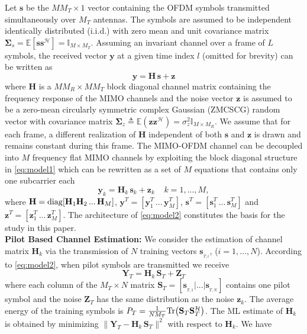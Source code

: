 \documentclass{article}
\def\cro#1{\left[#1\right]}                \def\stdcro#1{[#1]}
\def\bigcro#1{\bigl[#1\bigr]}              \def\biggcro#1{\biggl[#1\biggr]}
\def\esp{{\mathrm{E}}\,}              \def\Esp#1{{\mathrm{E}}\bigcro{#1}}  \def\Esph#1#2{\underset{{#1}}{\mathrm{E}}\bigcro{#2}}               \def\Espold#1{{\mathrm{E}}\cro{#1}}
\def\H{{\mathbf H}}
\def\tg{\mathcal{H}}
\def\y{{\bm y }}
\def\s{{\bm s }}
\def\z{{\bm z }}
\def\esp{{\mathbb E}}
\def\eye{{\mathbb I}}
\def\sig{\mathbf \Sigma}
\newcommand{\mb}{\mathbf}
\begin{document}
Let $\s$ be the $M M_T\times 1$ vector containing the OFDM symbols transmitted simultaneously over $M_T$ antennas. The symbols are assumed to be independent identically distributed (i.i.d.) with zero mean and unit covariance matrix $\sig_s=\esp[\s\s^\tg]=\eye_{M\times{M_T}}$. Assuming an invariant channel over a frame of $L$ symbols, the received vector $\y$ at a given time index $l$ (omitted for brevity) can be written as
\begin{equation}
\label{eq:model1}
\y = \H \, \s + \z
\end{equation}
where $\H$ is a $M M_R \times M M_T$ block diagonal channel matrix containing the frequency response of the MIMO channels and the noise vector $\z$ is assumed to be a zero-mean circularly symmetric complex Gaussian  (ZMCSCG) random vector with covariance matrix $\sig_z \triangleq \mathbb{E}(\z \z^{\mathcal{H}})=\sigma^2_z \mathbb{I}_{M\times{M_R}}$. We assume that for each frame, a different realization of $\H$ independent of both $\s$ and $\z$ is drawn and remains constant during this frame.
The MIMO-OFDM channel can be decoupled into $M$ frequency flat MIMO channels by exploiting the block diagonal structure in \eqref{eq:model1} which can be rewritten as a set of $M$ equations that contains only one subcarrier each
\begin{equation}
\label{eq:model2}
\y_k = \H_k \, \s_k + \z_k \;\;\;\; k=1,...,M,
\end{equation}
where $\H = {\rm diag}{[\H_1 \H_2 \,...\, \H_M]}$, $\y^T=[\y_1^T \, ...\, \y_M^T]$, $\s^T=[\s_1^T \, ...\, \s_M^T]$ and $\z^T=[\z_1^T \, ...\, \z_M^T]$. The architecture of \eqref{eq:model2} constitutes the basis for the study in this paper.
\vspace{3mm}
\\
\textbf{Pilot Based Channel Estimation:}
We consider the estimation of channel matrix $\H_k$ via the transmission of $N$ training vectors $\s_{_{T,i}}$,   ($i=1,...,N$).
According to \eqref{eq:model2}, when pilot symbols are transmitted we receive
 \begin{equation}
   \label{eq:model3}
         \mathbf{Y}_T = \H_k \,\mathbf{S}_T + \mathbf{Z}_T
  \end{equation}
where each column of the $M_T \times N$ matrix $\mathbf{S}_T=[\s_{_{T,1}}|...|\s_{_{T,N}}]$ contains one pilot symbol and the noise $\mathbf{Z}_T$ has the same distribution as the noise $\z_k$. The average energy of the training symbols is $P_T = \frac{1}{N M_T}{\rm Tr}\big(\mb{S}_T \mb{S}_T^\tg\big)$.
The ML estimate of $\H_k$ is obtained by minimizing $\|\mathbf{Y}_T-\H_k \,\mathbf{S}_T\|^2$ with respect to $\H_k$. We have
\end{document}
